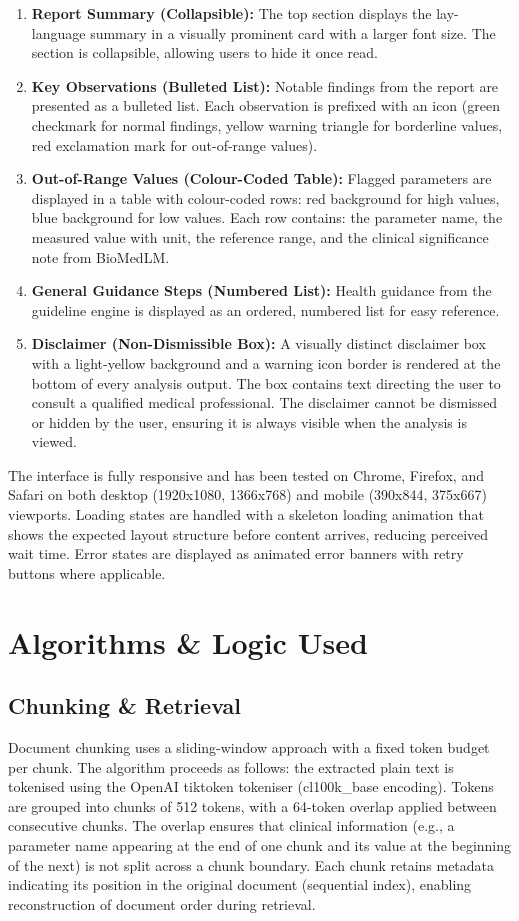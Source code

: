 \documentclass[12pt,a4paper]{report}
\begin{document}
\begin{enumerate}
    \item \textbf{Report Summary (Collapsible):} The top section displays the lay-language summary in a visually prominent card with a larger font size. The section is collapsible, allowing users to hide it once read.
    \item \textbf{Key Observations (Bulleted List):} Notable findings from the report are presented as a bulleted list. Each observation is prefixed with an icon (green checkmark for normal findings, yellow warning triangle for borderline values, red exclamation mark for out-of-range values).
    \item \textbf{Out-of-Range Values (Colour-Coded Table):} Flagged parameters are displayed in a table with colour-coded rows: red background for high values, blue background for low values. Each row contains: the parameter name, the measured value with unit, the reference range, and the clinical significance note from BioMedLM.
    \item \textbf{General Guidance Steps (Numbered List):} Health guidance from the guideline engine is displayed as an ordered, numbered list for easy reference.
    \item \textbf{Disclaimer (Non-Dismissible Box):} A visually distinct disclaimer box with a light-yellow background and a warning icon border is rendered at the bottom of every analysis output. The box contains text directing the user to consult a qualified medical professional. The disclaimer cannot be dismissed or hidden by the user, ensuring it is always visible when the analysis is viewed.
\end{enumerate}

The interface is fully responsive and has been tested on Chrome, Firefox, and Safari on both desktop (1920x1080, 1366x768) and mobile (390x844, 375x667) viewports. Loading states are handled with a skeleton loading animation that shows the expected layout structure before content arrives, reducing perceived wait time. Error states are displayed as animated error banners with retry buttons where applicable.

\section{Algorithms \& Logic Used}

\subsection{Chunking \& Retrieval}
Document chunking uses a sliding-window approach with a fixed token budget per chunk. The algorithm proceeds as follows: the extracted plain text is tokenised using the OpenAI tiktoken tokeniser (cl100k\_base encoding). Tokens are grouped into chunks of 512 tokens, with a 64-token overlap applied between consecutive chunks. The overlap ensures that clinical information (e.g., a parameter name appearing at the end of one chunk and its value at the beginning of the next) is not split across a chunk boundary. Each chunk retains metadata indicating its position in the original document (sequential index), enabling reconstruction of document order during retrieval.
\end{document}
